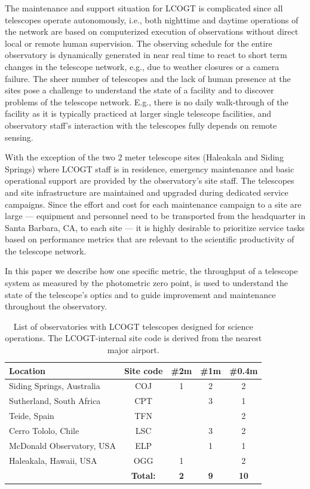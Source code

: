 \documentclass[]{spieman}
\begin{document}
The maintenance and support situation for LCOGT is complicated since all telescopes operate
autonomously, i.e., both nighttime and daytime operations of the network are based on computerized
execution of observations without direct local or remote human supervision. The observing schedule
for the entire observatory is dynamically generated in near real time to react to short term changes
in the telescope network\cite{saunders2014}, e.g., due to weather closures or a camera failure. The
sheer number of telescopes and the lack of human presence at the sites pose a challenge to
understand the state of a facility  and to discover problems of the telescope network. E.g., there
is no daily walk-through of the facility as it is typically practiced at larger single telescope
facilities, and observatory staff's interaction with the telescopes fully depends on remote sensing.

With the exception of the two 2 meter telescope sites (Haleakala and Siding Springs) where LCOGT
staff is in residence, emergency maintenance and basic operational support are provided by the
observatory's site staff. The telescopes and site infrastructure are maintained and upgraded during
dedicated service campaigns. Since the effort and cost for each maintenance campaign to a site are
large --- equipment and personnel need to be transported from the headquarter in Santa Barbara, CA,
to each site --- it is highly desirable to prioritize service tasks based on performance metrics
that are relevant to the scientific productivity of the telescope network.


In this paper we describe how one specific metric, the throughput of a telescope system as measured
by the photometric zero point, is used to understand the state of the
telescope's optics and to guide improvement and maintenance throughout the observatory.


\begin{table}[h]
\centering
\begin{tabular} {|l|c|ccc|} \hline
Location                  & Site code & \#2m & \#1m & \#0.4m \\ \hline
Siding Springs, Australia & COJ & 1 & 2 & 2  \\
Sutherland, South Africa  & CPT &   & 3 & 1 \\
Teide, Spain              & TFN &   &   & 2 \\
Cerro Tololo, Chile       & LSC &   & 3 & 2 \\
McDonald Observatory, USA & ELP &   & 1 & 1\\
Haleakala, Hawaii, USA    & OGG & 1 &   & 2 \\\hline
                       &   \bf Total:  & \bf 2 & \bf 9 & \bf 10 \\ \hline
\end{tabular}
\vspace{1ex}
\caption{\label{tab_sites} List of observatories with LCOGT telescopes designed for science
operations. The LCOGT-internal site code is derived from the nearest major airport. }
\end{table}
\end{document}
